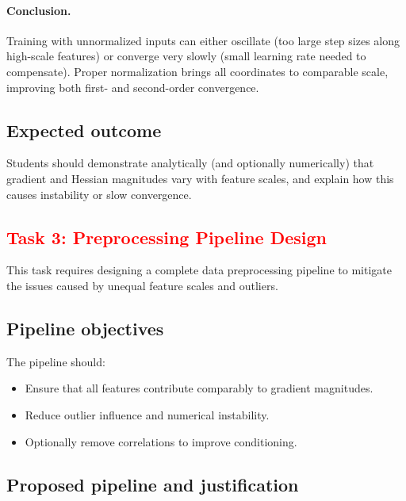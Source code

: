 \documentclass[11pt,a4paper]{article}
\begin{document}
\paragraph{Conclusion.}
Training with unnormalized inputs can either oscillate (too large step sizes
along high-scale features) or converge very slowly (small learning rate needed
to compensate). Proper normalization brings all coordinates to comparable
scale, improving both first- and second-order convergence.

\subsection*{Expected outcome}
Students should demonstrate analytically (and optionally numerically) that
gradient and Hessian magnitudes vary with feature scales, and explain how this
causes instability or slow convergence.

\subsection{\textcolor{red}{Task 3: Preprocessing Pipeline Design}}

This task requires designing a complete data preprocessing pipeline to mitigate
the issues caused by unequal feature scales and outliers.

\subsection*{Pipeline objectives}
The pipeline should:
\begin{itemize}
  \item Ensure that all features contribute comparably to gradient magnitudes.
  \item Reduce outlier influence and numerical instability.
  \item Optionally remove correlations to improve conditioning.
\end{itemize}

\subsection*{Proposed pipeline and justification}
\end{document}
